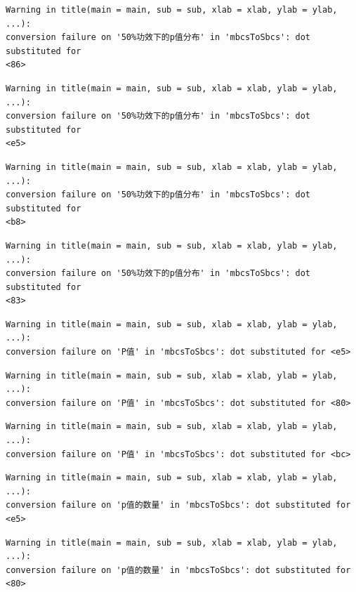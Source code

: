\documentclass[
  letterpaper,
  DIV=11,
  numbers=noendperiod]{scrreprt}
\begin{document}
\begin{verbatim}
Warning in title(main = main, sub = sub, xlab = xlab, ylab = ylab, ...):
conversion failure on '50%功效下的p值分布' in 'mbcsToSbcs': dot substituted for
<86>
\end{verbatim}

\begin{verbatim}
Warning in title(main = main, sub = sub, xlab = xlab, ylab = ylab, ...):
conversion failure on '50%功效下的p值分布' in 'mbcsToSbcs': dot substituted for
<e5>
\end{verbatim}

\begin{verbatim}
Warning in title(main = main, sub = sub, xlab = xlab, ylab = ylab, ...):
conversion failure on '50%功效下的p值分布' in 'mbcsToSbcs': dot substituted for
<b8>
\end{verbatim}

\begin{verbatim}
Warning in title(main = main, sub = sub, xlab = xlab, ylab = ylab, ...):
conversion failure on '50%功效下的p值分布' in 'mbcsToSbcs': dot substituted for
<83>
\end{verbatim}

\begin{verbatim}
Warning in title(main = main, sub = sub, xlab = xlab, ylab = ylab, ...):
conversion failure on 'P值' in 'mbcsToSbcs': dot substituted for <e5>
\end{verbatim}

\begin{verbatim}
Warning in title(main = main, sub = sub, xlab = xlab, ylab = ylab, ...):
conversion failure on 'P值' in 'mbcsToSbcs': dot substituted for <80>
\end{verbatim}

\begin{verbatim}
Warning in title(main = main, sub = sub, xlab = xlab, ylab = ylab, ...):
conversion failure on 'P值' in 'mbcsToSbcs': dot substituted for <bc>
\end{verbatim}

\begin{verbatim}
Warning in title(main = main, sub = sub, xlab = xlab, ylab = ylab, ...):
conversion failure on 'p值的数量' in 'mbcsToSbcs': dot substituted for <e5>
\end{verbatim}

\begin{verbatim}
Warning in title(main = main, sub = sub, xlab = xlab, ylab = ylab, ...):
conversion failure on 'p值的数量' in 'mbcsToSbcs': dot substituted for <80>
\end{verbatim}
\end{document}
